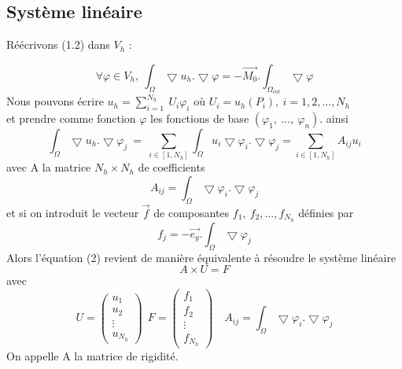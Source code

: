 \documentclass[a4paper,12pt,titlepage]{report}
\begin{document}
\begin{onehalfspace}
\subsection{Système linéaire}

Réécrivons (1.2) dans $V_{h}$ : 

\[
	\forall \varphi \in V_{h} , \ \int_{\Omega}\bigtriangledown u_{h}. \bigtriangledown \varphi = -\vec{M_{0}}. \int_{\Omega_{int}}\bigtriangledown \varphi
\]
Nous pouvons écrire $u_{h} = \sum_{i=1}^{N_{h}}{\ U_{i}\varphi_{i}} \text{ \ \ où } U_{i} = u_h(P_{i}),\  i= 1,2,...,N_{h}$ \\ et prendre comme fonction $\varphi$ les fonctions de base $(\varphi_1,\ ...,\ \varphi_n)$.
ainsi
\[
	\int_{\Omega}\bigtriangledown u_{h}.\bigtriangledown \varphi_j\ 
	=\ 
	\sum_{i \in [1, N_{h}]} \int_{\Omega}u_{i}\bigtriangledown\varphi_{i}. \bigtriangledown\varphi_{j} 
	= 
	\sum_{i \in [1, N_{h}]} A_{ij} u_{i}
\]
avec A la matrice $N_{h} \times N_{h}$ de coefficients
\[
A_{ij}  = \int_{\Omega}\bigtriangledown\varphi_{i}.\bigtriangledown\varphi_{j}
\]
et si on introduit le vecteur $\vec{f}$ de composantes $f_{1},\ f_{2},..., f_{N_{h}}$ définies par
\[
f_{j} =  -\vec{e_{y}}.\int_{\Omega} \bigtriangledown\varphi_{j}
\]
Alors l'équation (2) revient de manière équivalente à résoudre le système linéaire 
\[
	A \times U =F
\]
 avec 
\[
U = 
\begin{pmatrix}
   u_{1} \\
   u_{2} \\
   \vdots \\
   u_{N_{h}}
\end{pmatrix}
\ \ F = 
\begin{pmatrix}
   f_{1} \\
   f_{2} \\
   \vdots \\
   f_{N_{h}}
\end{pmatrix}
\quad
A_{ij}  = \int_{\Omega}\bigtriangledown \varphi_{i}. \bigtriangledown \varphi_{j}
\]
On appelle A la matrice de rigidité.  \\

\newpage

\end{onehalfspace}
\end{document}
